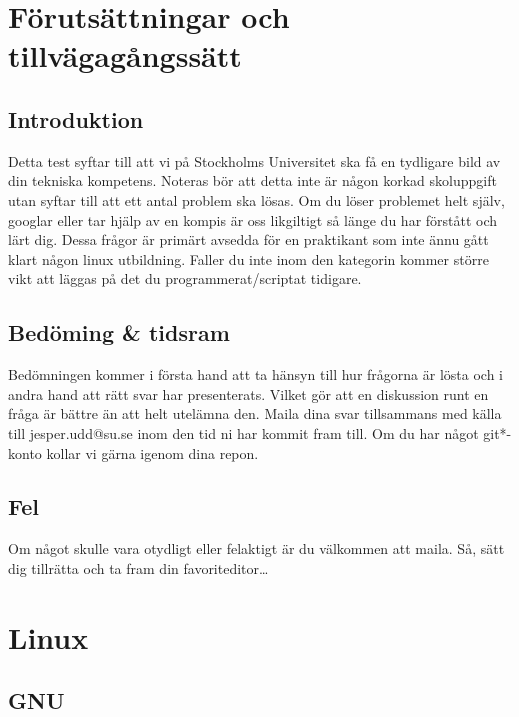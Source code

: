\section{Förutsättningar och
tillvägagångssätt}\label{fuxf6rutsuxe4ttningar-och-tillvuxe4gaguxe5ngssuxe4tt}

\subsection{Introduktion}\label{introduktion}

Detta test syftar till att vi på Stockholms Universitet ska få en
tydligare bild av din tekniska kompetens. Noteras bör att detta inte är
någon korkad skoluppgift utan syftar till att ett antal problem ska
lösas. Om du löser problemet helt själv, googlar eller tar hjälp av en
kompis är oss likgiltigt så länge du har förstått och lärt dig. Dessa
frågor är primärt avsedda för en praktikant som inte ännu gått klart
någon linux utbildning. Faller du inte inom den kategorin kommer större
vikt att läggas på det du programmerat/scriptat tidigare.

\subsection{Bedöming \& tidsram}\label{beduxf6ming-tidsram}

Bedömningen kommer i första hand att ta hänsyn till hur frågorna är
lösta och i andra hand att rätt svar har presenterats. Vilket gör att en
diskussion runt en fråga är bättre än att helt utelämna den. Maila dina
svar tillsammans med källa till jesper.udd@su.se inom den tid ni har
kommit fram till. Om du har något git*-konto kollar vi gärna igenom dina
repon.

\subsection{Fel}\label{fel}

Om något skulle vara otydligt eller felaktigt är du välkommen att maila.
Så, sätt dig tillrätta och ta fram din favoriteditor\ldots{}

\section{Linux}\label{linux}

\subsection{GNU}\label{gnu}

